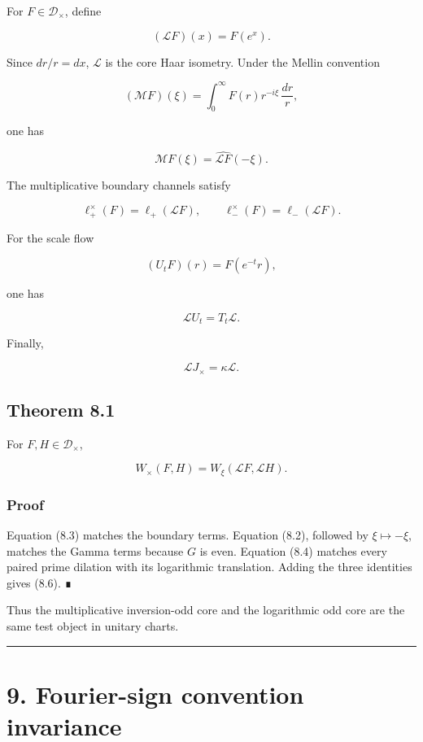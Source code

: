 For \(F\in\mathcal D_\times\), define

\[
(\mathcal LF)(x)=F(e^x).
\tag{8.1}
\]

Since \(dr/r=dx\), \(\mathcal L\) is the core Haar isometry. Under the Mellin
convention

\[
(\mathcal MF)(\xi)
=\int_0^\infty F(r)r^{-i\xi}\,\frac{dr}{r},
\]

one has

\[
\boxed{
\mathcal MF(\xi)=\widehat{\mathcal LF}(-\xi).
}
\tag{8.2}
\]

The multiplicative boundary channels satisfy

\[
\ell_+^\times(F)=\ell_+(\mathcal LF),
\qquad
\ell_-^\times(F)=\ell_-(\mathcal LF).
\tag{8.3}
\]

For the scale flow

\[
(U_tF)(r)=F(e^{-t}r),
\]

one has

\[
\boxed{
\mathcal L U_t=T_t\mathcal L.
}
\tag{8.4}
\]

Finally,

\[
\mathcal LJ_\times=\kappa\mathcal L.
\tag{8.5}
\]

\hypertarget{theorem-8.1}{%
\subsection{Theorem 8.1}\label{theorem-8.1}}

For \(F,H\in\mathcal D_\times\),

\[
\boxed{
W_\times(F,H)
=W_\xi(\mathcal LF,\mathcal LH).
}
\tag{8.6}
\]

\hypertarget{proof-3}{%
\subsubsection{Proof}\label{proof-3}}

Equation (8.3) matches the boundary terms. Equation (8.2), followed by
\(\xi\mapsto-\xi\), matches the Gamma terms because \(G\) is even. Equation
(8.4) matches every paired prime dilation with its logarithmic translation.
Adding the three identities gives (8.6). ∎

Thus the multiplicative inversion-odd core and the logarithmic odd core are the
same test object in unitary charts.

\begin{center}\rule{0.5\linewidth}{0.5pt}\end{center}

\hypertarget{fourier-sign-convention-invariance}{%
\section{9. Fourier-sign convention invariance}\label{fourier-sign-convention-invariance}}

